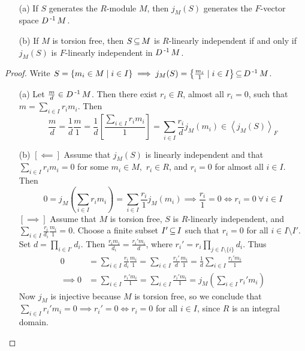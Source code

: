 \documentclass[11pt]{book}
\theoremstyle{definition}   \newtheorem{defn}[counter]{Definition} %
\newcommand{\bs}{\setminus}   \newcommand{\A}{\mathcal{A}}   \newcommand{\sy}{\textnormal{Syl}}   \newcommand{\size}[1]{\left| #1 \right|}
\newcommand{\gen}[1]{\left\langle #1 \right\rangle}   \newcommand{\stab}[2]{\tn{Stab}_{#1}(#2)}   \newcommand{\fix}[2]{\tn{Fix}_{#1}(#2)}   \newcommand{\op}{^{\tn{op}}}
\numberwithin{counter}{chapter}
\begin{document}
\begin{lemma}\ 
\begin{enumerate}
\item[(a)] If $S$ generates the $R$-module $M$, then $j_M(S)$ generates the $F$-vector space $D\operatorname{^{-1}} M$. 
\item[(b)] If $M$ is torsion free, then $S \operatorname{\subseteq} M$ is $R$-linearly independent if and only if $j_M(S)$ is $F$-linearly independent in $D\operatorname{^{-1}} M$. 
\end{enumerate}
\end{lemma}

\begin{proof} Write $S = \{m_i \in M \mid i \in I\} \implies j_M(S) = \left\{ \frac{m_i}{1} \mid i \in I \right\} \operatorname{\subseteq} D\operatorname{^{-1}} M$. 
\begin{enumerate}
\item[(a)] Let $\frac{m}{d} \in D\operatorname{^{-1}} M$. Then there exist $r_i \in R$, almost all $r_i = 0$, such that $m = \sum_{i \in I} r_i m_i$. Then
	\[\frac{m}{d} = \frac{1}{d} \frac{m}{1} = \frac{1}{d} \left[\frac{\sum_{i \in I} r_i m_i}{1}\right] = \sum_{i \in I} \frac{r_i}{d} j_M(m_i) \in \gen{j_M(S)}_F \]
\item[(b)] $[\impliedby]$ Assume that $j_M(S)$ is linearly independent and that $\sum_{i \in I} r_i m_i = 0$ for some $m_i \in M,$ $r_i \in R$, and $r_i = 0$ for almost all $i \in I$. Then
	\[0 = j_M \left(\sum_{i \in I} r_i m_i\right) = \sum_{i \in I} \frac{r_i}{1} j_M(m_i) \implies \frac{r_i}{1} = 0 \iff r_i = 0 \ \forall \ i \in I \]
$[\implies]$ Assume that $M$ is torsion free, $S$ is $R$-linearly independent, and $\sum_{i \in I} \frac{r_i}{d_i} \frac{m_i}{1} = 0$. Choose a finite subset $I' \operatorname{\subseteq} I$ such that $r_i = 0$ for all $i \in I \bs I'$. Set $d = \prod_{i \in I'} d_i$. Then $\frac{r_i m_i}{d_i} = \frac{r_i' m_i}{d}$, where $r_i' = r_i \prod_{j \in I \bs \{i\}} d_i$. Thus
\begin{align*}
0 &= \sum_{i \in I} \frac{r_i}{d_i} \frac{m_i}{1} = \sum_{i \in I} \frac{r_i'}{d} \frac{m_i}{1} = \frac{1}{d} \sum_{i \in I} \frac{r_i' m_i}{1} \\
\implies 0 &= \sum_{i \in I} \frac{r_i' m_i}{1} = \sum_{i \in I} \frac{r_i' m_i}{1} = j_M\left(\sum_{i \in I} r_i' m_i\right)
\end{align*}
Now $j_M$ is injective because $M$ is torsion free, so we conclude that $\sum_{i \in I} r_i' m_i = 0 \implies r_i' = 0 \iff r_i = 0$ for all $i \in I$, since $R$ is an integral domain. 
\end{enumerate}
\end{proof}
\end{document}
